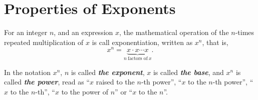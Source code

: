 \documentclass[en,11pt]{elegantbook}
\begin{document}
\hypertarget{properties-of-exponents}{%
\section{Properties of Exponents}\label{properties-of-exponents}}

For an integer \(n\), and an expression \(x\), the mathematical operation of the \(n\)-times repeated multiplication of \(x\) is call exponentiation, written as \(x^n\), that is,
\[
x^n=\underbrace{x\cdot x \cdots x}_{n~\text{factors of}~x}.
\]

In the notation \(x^n\), \(n\) is called \textbf{\emph{the exponent}}, \(x\) is called \textbf{\emph{the base}}, and \(x^n\) is called \textbf{\emph{the power}}, read as ``\(x\) raised to the \(n\)-th power'', ``\(x\) to the \(n\)-th power'', ``\(x\) to the \(n\)-th'', ``\(x\) to the power of \(n\)'' or ``\(x\) to the \(n\)''.
\end{document}
